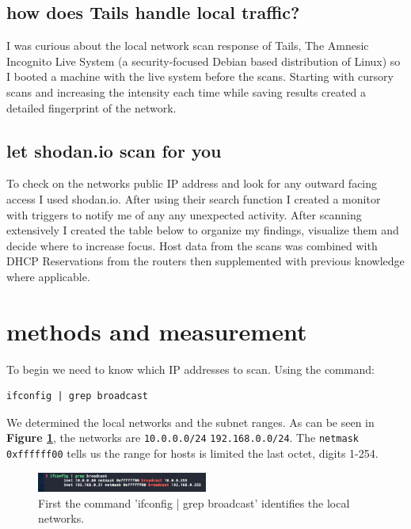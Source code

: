 \documentclass[10pt]{article}
\begin{document}
\subsection*{how does Tails handle local traffic?}

I was curious about the local network scan response of Tails, The Amnesic Incognito Live System (a security-focused Debian based distribution of Linux) so I booted a machine 
with the live system before the scans. Starting with cursory scans and increasing the intensity each time while saving results created a detailed fingerprint 
of the network.

\subsection*{let shodan.io scan for you}

To check on the networks public IP address and look for any outward facing access I used shodan.io.\cite{shodan}
After using their search function I created a monitor with triggers to notify me of any any unexpected activity. After scanning extensively I created the table below to organize
my findings, visualize them and decide where to increase focus. Host data from the scans was combined with DHCP Reservations from the routers then supplemented with previous knowledge 
where applicable.

\section*{methods and measurement}
To begin we need to know which IP addresses to scan. Using the command: \begin{verbatim}ifconfig | grep broadcast\end{verbatim} 
We determined the local networks and the subnet ranges. As can be seen in \textbf{Figure \ref{ifconfig image}}, the networks are \verb|10.0.0.0/24|
\verb|192.168.0.0/24|. The \verb|netmask 0xffffff00| tells us the range for hosts is limited the last octet, digits 1-254.

\begin{figure}[H]
\centering
\includegraphics[width=0.5\textwidth]{ifconfig.png}
\caption{First the command 'ifconfig | grep broadcast' identifies the local networks.}\label{ifconfig image}
\end{figure}
\end{document}
